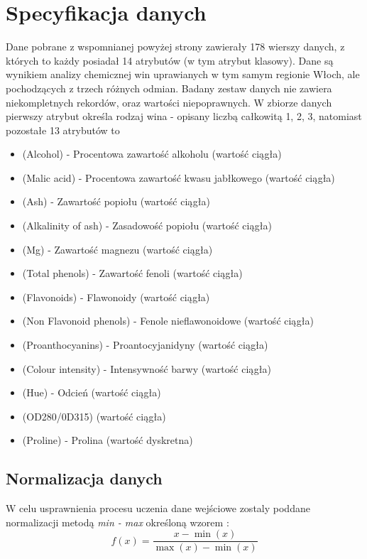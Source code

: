 \documentclass[12pt,twoside]{article}
\begin{document}
\section{Specyfikacja danych}
Dane pobrane z wspomnianej powyżej strony zawierały 178 wierszy danych, z których to każdy posiadał 14 atrybutów (w tym atrybut klasowy). Dane
są wynikiem analizy chemicznej win uprawianych w tym samym regionie Włoch,
ale pochodzących z trzech różnych odmian. Badany zestaw danych nie zawiera
niekompletnych rekordów, oraz wartości niepoprawnych. W zbiorze danych pierwszy
atrybut określa rodzaj wina - opisany liczbą całkowitą {1, 2, 3}, natomiast pozostałe
13 atrybutów to
\begin{itemize}
\item (Alcohol) - Procentowa zawartość alkoholu (wartość ciągła)
\item (Malic acid) - Procentowa zawartość kwasu jabłkowego (wartość ciągła)
\item (Ash) - Zawartość popiołu (wartość ciągła)
\item (Alkalinity of ash) - Zasadowość popiołu (wartość ciągła)
\item (Mg) - Zawartość magnezu (wartość ciągła)
\item (Total phenols) - Zawartość fenoli (wartość ciągła)
\item (Flavonoids) - Flawonoidy (wartość ciągła)
\item (Non Flavonoid phenols) - Fenole nieflawonoidowe (wartość ciągła)
\item (Proanthocyanins) - Proantocyjanidyny (wartość ciągła)
\item (Colour intensity) - Intensywność barwy (wartość ciągła)
\item (Hue) - Odcień (wartość ciągła)
\item (OD280/0D315) (wartość ciągła)
\item (Proline) - Prolina (wartość dyskretna)
\end{itemize}
\clearpage

\subsection{Normalizacja danych}
W celu usprawnienia procesu uczenia dane wejściowe zostaly poddane normalizacji metodą \textit{min - max} określoną wzorem \cite{norm}:
\begin{equation}
f(x) = \frac{x - \min{(x)}}{\max{(x)} - \min{(x)}}
\end{equation}
\end{document}

